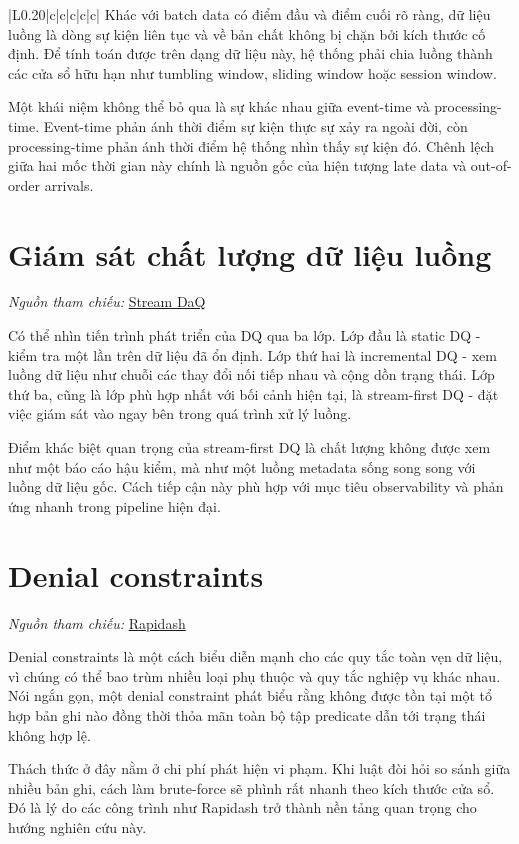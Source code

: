 {\begin{longtable}{|L{0.20\textwidth}|c|c|c|c|c|}
Khác với batch data có điểm đầu và điểm cuối rõ ràng, dữ liệu luồng là dòng sự kiện liên tục và về bản chất không bị chặn bởi kích thước cố định. Để tính toán được trên dạng dữ liệu này, hệ thống phải chia luồng thành các cửa sổ hữu hạn như tumbling window, sliding window hoặc session window.

Một khái niệm không thể bỏ qua là sự khác nhau giữa event-time và processing-time. Event-time phản ánh thời điểm sự kiện thực sự xảy ra ngoài đời, còn processing-time phản ánh thời điểm hệ thống nhìn thấy sự kiện đó. Chênh lệch giữa hai mốc thời gian này chính là nguồn gốc của hiện tượng late data và out-of-order arrivals.

\section{Giám sát chất lượng dữ liệu luồng}

\noindent \textit{Nguồn tham chiếu: }
\href{https://arxiv.org/abs/2506.06147}{Stream DaQ}

Có thể nhìn tiến trình phát triển của DQ qua ba lớp. Lớp đầu là static DQ - kiểm tra một lần trên dữ liệu đã ổn định. Lớp thứ hai là incremental DQ - xem luồng dữ liệu như chuỗi các thay đổi nối tiếp nhau và cộng dồn trạng thái. Lớp thứ ba, cũng là lớp phù hợp nhất với bối cảnh hiện tại, là stream-first DQ - đặt việc giám sát vào ngay bên trong quá trình xử lý luồng.

Điểm khác biệt quan trọng của stream-first DQ là chất lượng không được xem như một báo cáo hậu kiểm, mà như một luồng metadata sống song song với luồng dữ liệu gốc. Cách tiếp cận này phù hợp với mục tiêu observability và phản ứng nhanh trong pipeline hiện đại.

\section{Denial constraints}

\noindent \textit{Nguồn tham chiếu: }
\href{https://dl.acm.org/doi/10.14778/3659437.3659454}{Rapidash}

Denial constraints là một cách biểu diễn mạnh cho các quy tắc toàn vẹn dữ liệu, vì chúng có thể bao trùm nhiều loại phụ thuộc và quy tắc nghiệp vụ khác nhau. Nói ngắn gọn, một denial constraint phát biểu rằng không được tồn tại một tổ hợp bản ghi nào đồng thời thỏa mãn toàn bộ tập predicate dẫn tới trạng thái không hợp lệ.

Thách thức ở đây nằm ở chi phí phát hiện vi phạm. Khi luật đòi hỏi so sánh giữa nhiều bản ghi, cách làm brute-force sẽ phình rất nhanh theo kích thước cửa sổ. Đó là lý do các công trình như Rapidash trở thành nền tảng quan trọng cho hướng nghiên cứu này.


\end{longtable}}
